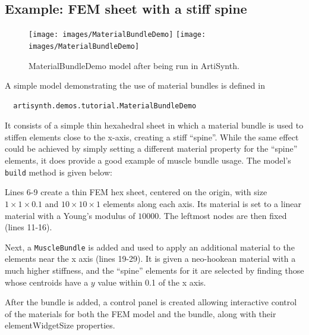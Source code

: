 \subsection{Example: FEM sheet with a stiff spine}
\label{MaterialBundleDemo:sec}

\begin{figure}[ht]
\begin{center}
\iflatexml
 \texttt{[image: images/MaterialBundleDemo]}
\else
 \texttt{[image: images/MaterialBundleDemo]}
\fi
\end{center}
\caption{MaterialBundleDemo model after being run in ArtiSynth.}
\label{MaterialBundleDemo:fig}
\end{figure}

A simple model demonstrating the use of material bundles
is defined in
%
\begin{verbatim}
  artisynth.demos.tutorial.MaterialBundleDemo
\end{verbatim}
%
It consists of a simple thin hexahedral sheet in which a material
bundle is used to stiffen elements close to the x-axis,
creating a stiff ``spine''. While the same effect could be achieved by
simply setting a different material property for the ``spine''
elements, it does provide a good example of muscle bundle usage.
%
The model's {\tt build} method is given below:
\lstset{numbers=left}
\iflatexml

\else

\fi
\lstset{numbers=none}

Lines 6-9 create a thin FEM hex sheet, centered on the origin, with
size $1 \times 1 \times 0.1$ and $10 \times 10 \times 1$ elements
along each axis. Its material is set to a linear material with a
Young's modulus of $10000$. The leftmost nodes are then fixed (lines
11-16).

Next, a {\tt MuscleBundle} is added and used to apply an additional
material to the elements near the x axis (lines 19-29). It is given a
neo-hookean material with a much higher stiffness, and the ``spine''
elements for it are selected by finding those whose centroids 
have a $y$ value within 0.1 of the x axis.

After the bundle is added, a control panel is created allowing
interactive control of the materials for both the FEM model and the
bundle, along with their {\sf elementWidgetSize} properties.

